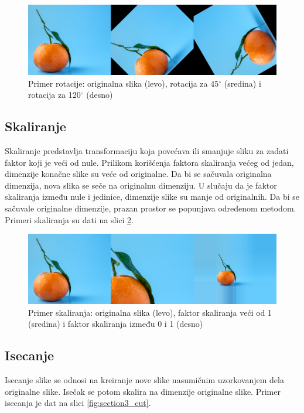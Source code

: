 \documentclass[12pt,oneside]{memoir}
\begin{document}
\begin{figure}[ht]
    \centering
    \includegraphics[width=1\textwidth]{matfmaster/glava3/rotate.jpg}
    \caption{Primer rotacije: originalna slika (levo), rotacija za 45\(^\circ\) (sredina) i  rotacija za 120\(^\circ\) (desno) \cite{unsplashOrange}}
    \label{fig:section3_rot}
\end{figure}

\subsection{Skaliranje}
Skaliranje predstavlja transformaciju koja povećava ili smanjuje sliku za zadati faktor koji je veći od nule. Prilikom korišćenja faktora skaliranja većeg od jedan, dimenzije konačne slike su veće od originalne. Da bi se sačuvala originalna dimenzija, nova slika se seče na originalnu dimenziju. U slučaju da je faktor skaliranja između nule i jedinice, dimenzije slike su manje od originalnih. Da bi se sačuvale originalne dimenzije, prazan prostor se popunjava određenom metodom. Primeri skaliranja su dati na slici \ref{fig:section3_scale}.

\begin{figure}[ht]
    \centering
    \includegraphics[width=1\textwidth]{matfmaster/glava3/scale.jpg}
    \caption{Primer skaliranja: originalna slika (levo), faktor skaliranja veći od 1 (sredina) i faktor skaliranja između 0 i 1 (desno) \cite{unsplashOrange}}
    \label{fig:section3_scale}
\end{figure}


\subsection{Isecanje}
Isecanje slike se odnosi na kreiranje nove slike nasumičnim uzorkovanjem dela originalne slike. Isečak se potom skalira na dimenzije originalne slike. Primer isecanja je dat na slici \ref{fig:section3_cut}.
\end{document}
